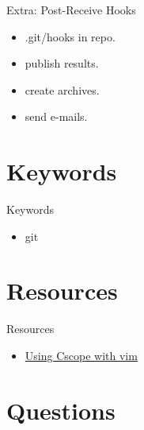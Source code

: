 \documentclass{workshop}
\begin{document}
\begin{frame}{Extra: Post-Receive Hooks}
\begin{itemize}
\item .git/hooks in repo.
\item publish results.
\item create archives.
\item send e-mails.
\end{itemize}
\end{frame}

\section{Keywords}

\begin{frame}{Keywords}
     \begin{itemize}
	\item git
      \end{itemize}
\end{frame}

\section{Resources}
\begin{frame}{Resources}
  \begin{itemize}
  \item \href{http://cscope.sourceforge.net/cscope_vim_tutorial.html}{Using Cscope with vim}
  \end{itemize}
\end{frame}

\section{Questions}
\end{document}
